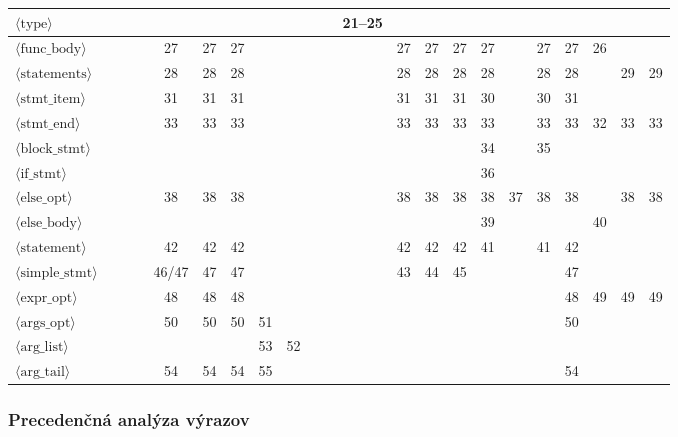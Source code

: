 \begin{table}[H]
{\begin{tabular}{|l|c|c|c|c|c|c|c|c|c|c|c|c|c|c|c|c|c|c|c|c|c|}
$\langle\text{type}\rangle$ & & & & & & & & & & & 21--25 & & & & & & & & & & \\ \hline
$\langle\text{func\_body}\rangle$ & & & & 27 & 27 & 27 & & & & & & 27 & 27 & 27 & 27 & & 27 & 27 & 26 & & \\ \hline
$\langle\text{statements}\rangle$ & & & & 28 & 28 & 28 & & & & & & 28 & 28 & 28 & 28 & & 28 & 28 & & 29 & 29 \\ \hline
$\langle\text{stmt\_item}\rangle$ & & & & 31 & 31 & 31 & & & & & & 31 & 31 & 31 & 30 & & 30 & 31 & & & \\ \hline
$\langle\text{stmt\_end}\rangle$ & & & & 33 & 33 & 33 & & & & & & 33 & 33 & 33 & 33 & & 33 & 33 & 32 & 33 & 33 \\ \hline
$\langle\text{block\_stmt}\rangle$ & & & & & & & & & & & & & & & 34 & & 35 & & & & \\ \hline
$\langle\text{if\_stmt}\rangle$ & & & & & & & & & & & & & & & 36 & & & & & & \\ \hline
$\langle\text{else\_opt}\rangle$ & & & & 38 & 38 & 38 & & & & & & 38 & 38 & 38 & 38 & 37 & 38 & 38 & & 38 & 38 \\ \hline
$\langle\text{else\_body}\rangle$ & & & & & & & & & & & & & & & 39 & & & & 40 & & \\ \hline
$\langle\text{statement}\rangle$ & & & & 42 & 42 & 42 & & & & & & 42 & 42 & 42 & 41 & & 41 & 42 & & & \\ \hline
$\langle\text{simple\_stmt}\rangle$ & & & & 46/47 & 47 & 47 & & & & & & 43 & 44 & 45 & & & & 47 & & & \\ \hline
$\langle\text{expr\_opt}\rangle$ & & & & 48 & 48 & 48 & & & & & & & & & & & & 48 & 49 & 49 & 49 \\ \hline
$\langle\text{args\_opt}\rangle$ & & & & 50 & 50 & 50 & 51 & & & & & & & & & & & 50 & & & \\ \hline
$\langle\text{arg\_list}\rangle$ & & & & & & & 53 & 52 & & & & & & & & & & & & & \\ \hline
$\langle\text{arg\_tail}\rangle$ & & & & 54 & 54 & 54 & 55 & & & & & & & & & & & 54 & & & \\ \hline
\end{tabular}%
}
\end{table}

\subsubsection{Precedenčná analýza výrazov}

